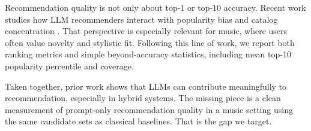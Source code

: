  Recommendation quality is not only about top-1 or top-10 accuracy. Recent work studies how LLM recommenders interact with popularity bias and catalog concentration \cite{lichtenberg2024popularity}. That perspective is especially relevant for music, where users often value novelty and stylistic fit. Following this line of work, we report both ranking metrics and simple beyond-accuracy statistics, including mean top-10 popularity percentile and coverage.

Taken together, prior work shows that LLMs can contribute meaningfully to recommendation, especially in hybrid systems. The missing piece is a clean measurement of prompt-only recommendation quality in a music setting using the same candidate sets as classical baselines. That is the gap we target.
